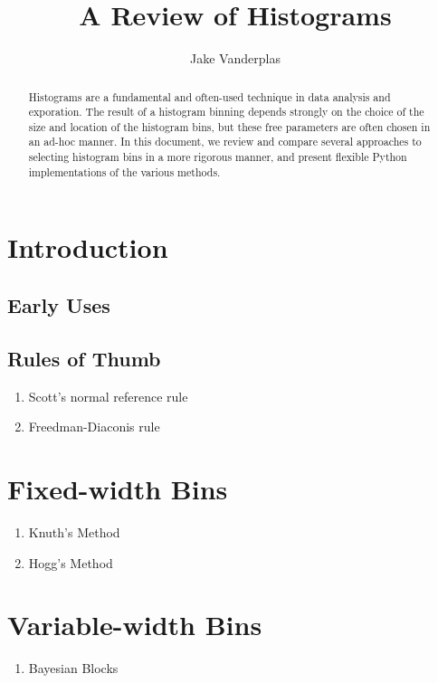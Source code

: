 \documentclass[12pt]{article}
\title{A Review of Histograms}
\author{Jake Vanderplas}
\begin{document}
\maketitle

\begin{abstract}
  Histograms are a fundamental and often-used technique in data analysis and
  exporation.  The result of a histogram binning depends strongly on the
  choice of the size and location of the histogram bins, but these free
  parameters are often chosen in an ad-hoc manner.  In this document, we
  review and compare several approaches to selecting histogram bins in a
  more rigorous manner, and present flexible Python implementations of
  the various methods.
\end{abstract}

\section{Introduction}
\subsection{Early Uses}

\subsection{Rules of Thumb}
\begin{enumerate}
\item Scott's normal reference rule \citep{Scott1979}
\item Freedman-Diaconis rule \citep{Freedman1981}
\end{enumerate}

\section{Fixed-width Bins}
\begin{enumerate}
\item Knuth's Method \citep{Knuth2006}
\item Hogg's Method \citep{Hogg2008}
\end{enumerate}

\section{Variable-width Bins}
\begin{enumerate}
\item Bayesian Blocks \citep{Scargle2012}
\end{enumerate}
\end{document}
